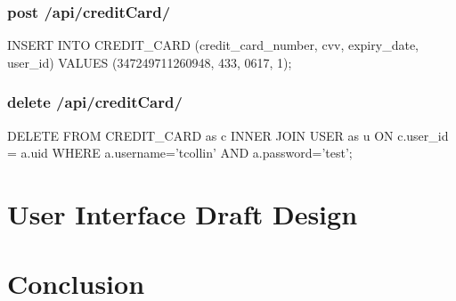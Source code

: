 \documentclass{article}
\begin{document}
\subsubsection{post /api/creditCard/}
INSERT INTO CREDIT_CARD (credit_card_number, cvv, expiry_date, user_id)
VALUES (347249711260948, 433, 0617, 1);
\subsubsection{delete /api/creditCard/}
DELETE FROM CREDIT_CARD as c INNER JOIN USER as u ON c.user_id = a.uid WHERE
a.username='tcollin' AND a.password='test';


\section{User Interface Draft Design} %

\section{Conclusion}
\end{document}
